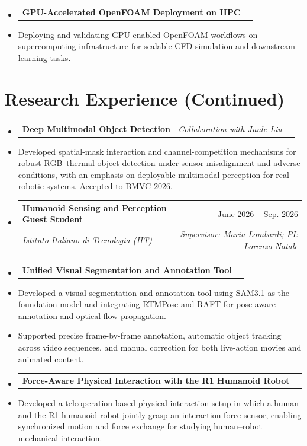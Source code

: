 \documentclass[11pt, letterpaper]{article}
\makeatletter
\newcommand{\resumeItem}[1]{
  \item\small{
    {#1 \vspace{-2pt}}
  }
}
\newcommand{\resumeSubheading}[4]{
  \vspace{-1pt}\item
    \begin{tabular*}{\linewidth}[t]{@{\extracolsep{\fill}}lr@{}}
      \textbf{#1} & #2 \\
      \textit{\small#3} & \textit{\small #4} \\
    \end{tabular*}\vspace{-5pt}
}
\newcommand{\resumeProjectHeading}[2]{
    \Needspace{4\baselineskip}
    \item
    \begin{tabularx}{\linewidth}{@{}>{\raggedright\arraybackslash}Xr@{}}
      \small#1 & #2 \\
    \end{tabularx}\vspace{-5pt}
}
\makeatother
\begin{document}
\begin{itemize}[leftmargin=0.15in, label={}]
    \resumeProjectHeading
      {\textbf{GPU-Accelerated OpenFOAM Deployment on HPC}}{}
      \resumeItem{Deploying and validating GPU-enabled OpenFOAM workflows on supercomputing infrastructure for scalable CFD simulation and downstream learning tasks.}

  \end{itemize}
\newpage
\section{Research Experience (Continued)}
  \begin{itemize}[leftmargin=0.15in, label={}]
    \resumeProjectHeading
      {\textbf{Deep Multimodal Object Detection} $|$ \emph{Collaboration with Junle Liu}}{}
      \resumeItem{Developed spatial-mask interaction and channel-competition mechanisms for robust RGB--thermal object detection under sensor misalignment and adverse conditions, with an emphasis on deployable multimodal perception for real robotic systems. Accepted to BMVC 2026.}

    \resumeSubheading
      {Humanoid Sensing and Perception Guest Student}{June 2026 -- Sep. 2026}
      {Istituto Italiano di Tecnologia (IIT)}{Supervisor: Maria Lombardi; PI: Lorenzo Natale}
    \resumeProjectHeading
      {\textbf{Unified Visual Segmentation and Annotation Tool}}{}
      \resumeItem{Developed a visual segmentation and annotation tool using SAM3.1 as the foundation model and integrating RTMPose and RAFT for pose-aware annotation and optical-flow propagation.}
      \resumeItem{Supported precise frame-by-frame annotation, automatic object tracking across video sequences, and manual correction for both live-action movies and animated content.}

    \resumeProjectHeading
      {\textbf{Force-Aware Physical Interaction with the R1 Humanoid Robot}}{}
      \resumeItem{Developed a teleoperation-based physical interaction setup in which a human and the R1 humanoid robot jointly grasp an interaction-force sensor, enabling synchronized motion and force exchange for studying human--robot mechanical interaction.}

  \end{itemize}
\end{document}
